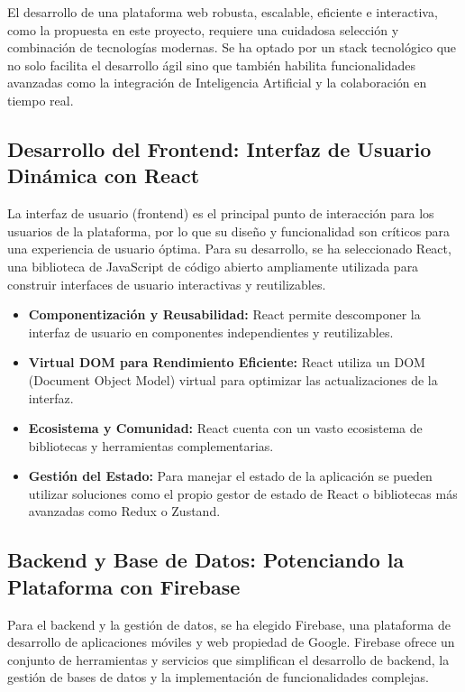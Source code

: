 \documentclass[12pt,a4paper]{report}
\begin{document}
El desarrollo de una plataforma web robusta, escalable, eficiente e interactiva, como la propuesta en este proyecto, requiere una cuidadosa selección y combinación de tecnologías modernas. Se ha optado por un stack tecnológico que no solo facilita el desarrollo ágil sino que también habilita funcionalidades avanzadas como la integración de Inteligencia Artificial y la colaboración en tiempo real.

\subsection{Desarrollo del Frontend: Interfaz de Usuario Dinámica con React}

La interfaz de usuario (frontend) es el principal punto de interacción para los usuarios de la plataforma, por lo que su diseño y funcionalidad son críticos para una experiencia de usuario óptima. Para su desarrollo, se ha seleccionado React, una biblioteca de JavaScript de código abierto ampliamente utilizada para construir interfaces de usuario interactivas y reutilizables.

\begin{itemize}
\item \textbf{Componentización y Reusabilidad:} React permite descomponer la interfaz de usuario en componentes independientes y reutilizables.

\item \textbf{Virtual DOM para Rendimiento Eficiente:} React utiliza un DOM (Document Object Model) virtual para optimizar las actualizaciones de la interfaz.

\item \textbf{Ecosistema y Comunidad:} React cuenta con un vasto ecosistema de bibliotecas y herramientas complementarias.

\item \textbf{Gestión del Estado:} Para manejar el estado de la aplicación se pueden utilizar soluciones como el propio gestor de estado de React o bibliotecas más avanzadas como Redux o Zustand.
\end{itemize}

\subsection{Backend y Base de Datos: Potenciando la Plataforma con Firebase}

Para el backend y la gestión de datos, se ha elegido Firebase, una plataforma de desarrollo de aplicaciones móviles y web propiedad de Google. Firebase ofrece un conjunto de herramientas y servicios que simplifican el desarrollo de backend, la gestión de bases de datos y la implementación de funcionalidades complejas.
\end{document}
